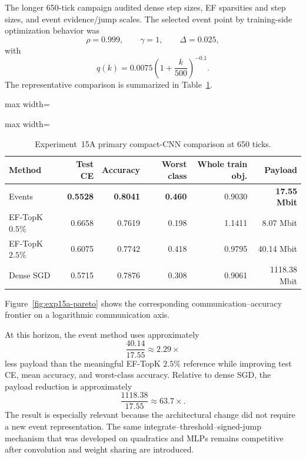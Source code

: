 The longer 650-tick campaign audited dense step sizes, EF sparsities and step sizes, and event evidence/jump scales. The selected event point by training-side optimization behavior was
\begin{equation}
\rho=0.999,
\qquad \gamma=1,
\qquad \Delta=0.025,
\end{equation}
with
\begin{equation}
q(k)=0.0075\left(1+\frac{k}{500}\right)^{-0.1}.
\end{equation}
The representative comparison is summarized in Table~\ref{tab:exp15a-primary-650}.
\begin{table}[ht]
\centering
\small
\caption{Experiment~15A primary compact-CNN comparison at 650 ticks.}
\label{tab:exp15a-primary-650}
\begin{adjustbox}{max width=\textwidth}
\begin{adjustbox}{max width=\textwidth}
\begin{tabular}{lrrrrr}
\toprule
Method & Test CE & Accuracy & Worst class & Whole train obj. & Payload\\
\midrule
Events & \textbf{0.5528} & \textbf{0.8041} & \textbf{0.460} & 0.9030 & \textbf{17.55 Mbit}\\
EF-TopK $0.5\%$ & 0.6658 & 0.7619 & 0.198 & 1.1411 & 8.07 Mbit\\
EF-TopK $2.5\%$ & 0.6075 & 0.7742 & 0.418 & 0.9795 & 40.14 Mbit\\
Dense SGD & 0.5715 & 0.7876 & 0.308 & 0.9061 & 1118.38 Mbit\\
\bottomrule
\end{tabular}
\end{adjustbox}
\end{adjustbox}
\end{table}

Figure~\ref{fig:exp15a-pareto} shows the corresponding communication--accuracy frontier on a logarithmic communication axis.

\ExpFifteenAParetoFigure

At this horizon, the event method uses approximately
\begin{equation}
\frac{40.14}{17.55}\approx\boxed{2.29\times}
\end{equation}
less payload than the meaningful EF-TopK $2.5\%$ reference while improving test CE, mean accuracy, and worst-class accuracy. Relative to dense SGD, the payload reduction is approximately
\begin{equation}
\frac{1118.38}{17.55}\approx\boxed{63.7\times}.
\end{equation}
The result is especially relevant because the architectural change did not require a new event representation. The same integrate--threshold--signed-jump mechanism that was developed on quadratics and MLPs remains competitive after convolution and weight sharing are introduced.


